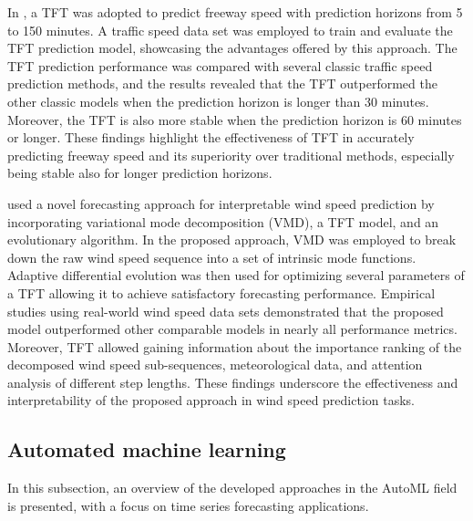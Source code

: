 In \cite{ZHANG2022329}, a TFT was adopted to predict freeway speed with prediction horizons from 5 to 150 minutes.
A traffic speed data set was employed to train and evaluate the TFT prediction model, showcasing the advantages offered by this approach.
The TFT prediction performance was compared with several classic traffic speed prediction methods, and the results revealed that the TFT outperformed the other classic models when the prediction horizon is longer than 30 minutes.
Moreover, the TFT is also more stable when the prediction horizon is 60 minutes or longer.
These findings highlight the effectiveness of TFT in accurately predicting freeway speed and its superiority over traditional methods, especially being stable also for longer prediction horizons.

\cite{WU2022123990} used a novel forecasting approach for interpretable wind speed prediction by incorporating variational mode decomposition (VMD), a TFT model, and an evolutionary algorithm.
In the proposed approach, VMD was employed to break down the raw wind speed sequence into a set of intrinsic mode functions.
Adaptive differential evolution was then used for optimizing several parameters of a TFT allowing it to achieve satisfactory forecasting performance.
Empirical studies using real-world wind speed data sets demonstrated that the proposed model outperformed other comparable models in nearly all performance metrics.
Moreover, TFT allowed gaining information about the importance ranking of the decomposed wind speed sub-sequences, meteorological data, and attention analysis of different step lengths.
These findings underscore the effectiveness and interpretability of the proposed approach in wind speed prediction tasks.


\vspace{0.1 cm}
\subsection{Automated machine learning}
\label{sec:automl}
\vspace{0.1 cm}

In this subsection, an overview of the developed approaches in the AutoML field is presented, with a focus on time series forecasting applications.

